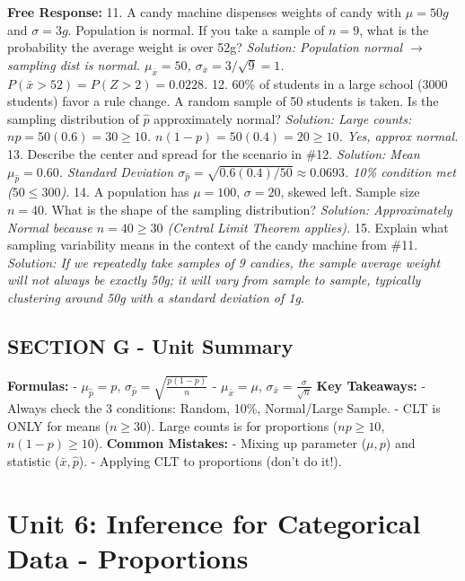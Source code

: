 \begin{workbookbox}
\textbf{Free Response:}
11. A candy machine dispenses weights of candy with $\mu=50g$ and $\sigma=3g$. Population is normal. If you take a sample of $n=9$, what is the probability the average weight is over 52g?
\textit{Solution: Population normal $\rightarrow$ sampling dist is normal. $\mu_{\bar{x}}=50$, $\sigma_{\bar{x}}=3/\sqrt{9}=1$. $P(\bar{x} > 52) = P(Z > 2) = 0.0228$.}
12. 60\% of students in a large school (3000 students) favor a rule change. A random sample of 50 students is taken. Is the sampling distribution of $\hat{p}$ approximately normal?
\textit{Solution: Large counts: $np=50(0.6)=30 \geq 10$. $n(1-p)=50(0.4)=20 \geq 10$. Yes, approx normal.}
13. Describe the center and spread for the scenario in \#12.
\textit{Solution: Mean $\mu_{\hat{p}} = 0.60$. Standard Deviation $\sigma_{\hat{p}} = \sqrt{0.6(0.4)/50} \approx 0.0693$. 10\% condition met ($50 \leq 300$).}
14. A population has $\mu=100$, $\sigma=20$, skewed left. Sample size $n=40$. What is the shape of the sampling distribution?
\textit{Solution: Approximately Normal because $n=40 \geq 30$ (Central Limit Theorem applies).}
15. Explain what sampling variability means in the context of the candy machine from \#11.
\textit{Solution: If we repeatedly take samples of 9 candies, the sample average weight will not always be exactly 50g; it will vary from sample to sample, typically clustering around 50g with a standard deviation of 1g.}
\end{workbookbox}

\section{SECTION G - Unit Summary}
\begin{lessonbox}
\textbf{Formulas:}
- $\mu_{\hat{p}} = p$, $\sigma_{\hat{p}} = \sqrt{\frac{p(1-p)}{n}}$
- $\mu_{\bar{x}} = \mu$, $\sigma_{\bar{x}} = \frac{\sigma}{\sqrt{n}}$
\textbf{Key Takeaways:}
- Always check the 3 conditions: Random, 10\%, Normal/Large Sample.
- CLT is ONLY for means ($n \geq 30$). Large counts is for proportions ($np \ge 10$, $n(1-p) \ge 10$).
\textbf{Common Mistakes:}
- Mixing up parameter ($\mu, p$) and statistic ($\bar{x}, \hat{p}$).
- Applying CLT to proportions (don't do it!).
\end{lessonbox}



\chapter{Unit 6: Inference for Categorical Data - Proportions}

